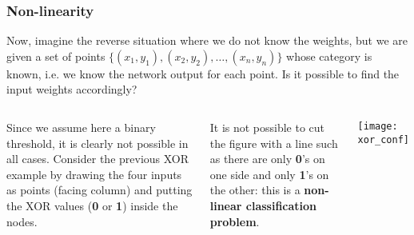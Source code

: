 %
\begin{frame}
\frametitle{Non-linearity}

Now, imagine the reverse situation where we do not know the weights,
but we are given a set of points \(\lbrace{(x_1,y_1)}, (x_2,y_2),
\dots, (x_n,y_n)\rbrace\) whose category is known, i.e. we know the
network output for each point. Is it possible to find the input
weights accordingly?

\bigskip

\begin{columns}[c]
   Since we assume here a binary threshold, it
  is clearly not possible in all cases. Consider the previous XOR
  example by drawing the four inputs as points (facing column) and
  putting the XOR values (\textbf{0} or \textbf{1}) inside the
  nodes. 

   It is not possible to cut the figure with a
  line such as there are only \textbf{0}'s on one side and only
  \textbf{1}'s on the other: this is a \textbf{non-linear
    classification problem}.
  \begin{center}
    \texttt{[image: xor\_conf]}
  \end{center}

\end{columns}

\end{frame}

